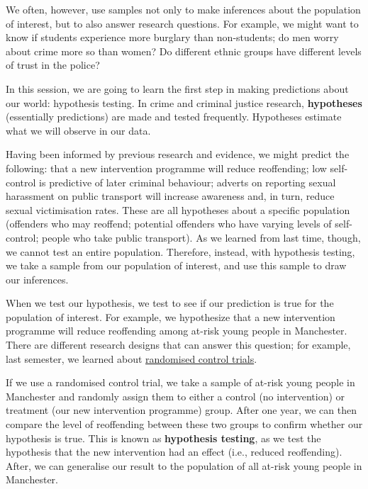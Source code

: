 \documentclass[
]{book}
\begin{document}
We often, however, use samples not only to make inferences about the population of interest, but to also answer research questions. For example, we might want to know if students experience more burglary than non-students; do men worry about crime more so than women? Do different ethnic groups have different levels of trust in the police?

In this session, we are going to learn the first step in making predictions about our world: hypothesis testing. In crime and criminal justice research, \textbf{hypotheses} (essentially predictions) are made and tested frequently. Hypotheses estimate what we will observe in our data.

Having been informed by previous research and evidence, we might predict the following: that a new intervention programme will reduce reoffending; low self-control is predictive of later criminal behaviour; adverts on reporting sexual harassment on public transport will increase awareness and, in turn, reduce sexual victimisation rates. These are all hypotheses about a specific population (offenders who may reoffend; potential offenders who have varying levels of self-control; people who take public transport). As we learned from last time, though, we cannot test an entire population. Therefore, instead, with hypothesis testing, we take a sample from our population of interest, and use this sample to draw our inferences.

When we test our hypothesis, we test to see if our prediction is true for the population of interest. For example, we hypothesize that a new intervention programme will reduce reoffending among at-risk young people in Manchester. There are different research designs that can answer this question; for example, last semester, we learned about \href{https://www.bi.team/publications/test-learn-adapt-developing-public-policy-with-randomised-controlled-trials/}{randomised control trials}.

If we use a randomised control trial, we take a sample of at-risk young people in Manchester and randomly assign them to either a control (no intervention) or treatment (our new intervention programme) group. After one year, we can then compare the level of reoffending between these two groups to confirm whether our hypothesis is true. This is known as \textbf{hypothesis testing}, as we test the hypothesis that the new intervention had an effect (i.e., reduced reoffending). After, we can generalise our result to the population of all at-risk young people in Manchester.
\end{document}
